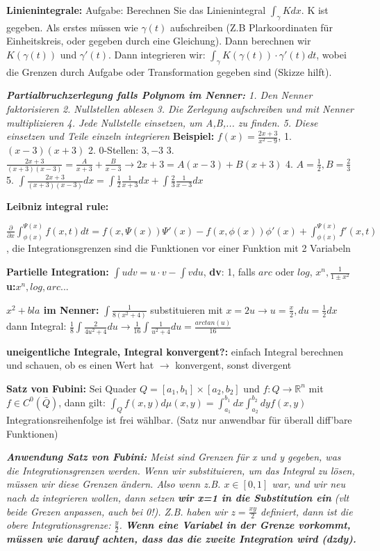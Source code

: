 \documentclass[a3paper, ngerman, 8pt]{article}
\begin{document}
\begin{multicols*}{3}
\textbf{Linienintegrale:} Aufgabe: Berechnen Sie das Linienintegral $\int_{\gamma} Kdx$. K ist gegeben. Als erstes müssen wie $\gamma (t)$ aufschreiben (Z.B Plarkoordinaten für Einheitskreis, oder gegeben durch eine Gleichung). Dann berechnen wir $K(\gamma (t))$ und $\gamma ' (t)$. Dann integrieren wir: $\int_{\gamma} K(\gamma (t))\cdot \gamma ' (t)dt$, wobei die Grenzen durch Aufgabe oder Transformation gegeben sind (Skizze hilft).

\textit{\textbf{Partialbruchzerlegung falls Polynom im Nenner:} 1. Den Nenner faktorisieren 2. Nullstellen ablesen 3. Die Zerlegung aufschreiben und mit Nenner multiplizieren 4. Jede Nullstelle einsetzen, um A,B,... zu finden. 5. Diese einsetzen und Teile einzeln integrieren}
\textbf{Beispiel: }$f(x)=\frac{2x+3}{x^2-9}$, 1. $(x-3)(x+3)$ 2. 0-Stellen: $3, -3$ 3. $\frac{2x+3}{(x+3)(x-3)}=\frac{A}{x+3}+ \frac{B}{x-3} \to 2x+3=A(x-3)+B(x+3)$ 4. $A=\frac{1}{2}, B=\frac{2}{3}$ 5. $\int\frac{2x+3}{(x+3)(x-3)}dx=\int\frac{1}{2}\frac{1}{x+3}dx+ \int\frac{2}{3}\frac{1}{x-3}dx$

\textbf{Leibniz integral rule:} 

$\frac{\partial}{\partial x}\int_{\phi (x)}^{\Psi (x)}f(x,t)dt= f(x, \Psi(x))\Psi'(x)-f(x, \phi (x))\phi'(x)+\int_{\phi (x)}^{\Psi(x)}f'(x, t)$, die Integrationsgrenzen sind die Funktionen vor einer Funktion mit 2 Variabeln

\textbf{Partielle Integration:} $\int u dv=u\cdot v -\int v du$, \textbf{dv}: 1, falls $arc$ oder $log$, $x^n, \frac{1}{1\pm x^2}$
\textbf{u:}$x^n, log, arc... $

\textbf{$x^2 + bla$ im Nenner:} $\int \frac{1}{8(x^2+4)}$ substituieren mit $x=2u \to u=\frac{x}{2}, du = \frac{1}{2}dx$ dann Integral: $\frac{1}{8}\int \frac{2}{4u^2+4}du \to \frac{1}{16} \int \frac{1}{u^2+4}du= \frac{arctan(u)}{16}$

\textbf{uneigentliche Integrale, Integral konvergent?:} einfach Integral berechnen und schauen, ob es einen Wert hat $\to$ konvergent, sonst divergent

\textbf{Satz von Fubini:} Sei Quader $Q=[a_1, b_1]\times[a_2, b_2]$ und $f: Q \to \mathbb{R}^n$ mit $f \in C^0(\bar{Q})$, dann gilt: $\int_Q f(x,y)d\mu (x, y)= \int_{a_1}^{b_1}dx\int_{a_2}^{b_2}dy f(x,y)$ Integrationsreihenfolge ist frei wählbar. (Satz nur anwendbar für überall diff'bare Funktionen)

\textit{\textbf{Anwendung Satz von Fubini:} Meist sind Grenzen für x und y gegeben, was die Integrationsgrenzen werden. Wenn wir substituieren, um das Integral zu lösen, müssen wir diese Grenzen ändern. Also wenn z.B. $x\in [0,1]$ war, und wir neu nach dz integrieren wollen, dann setzen \textbf{wir x=1 in die Substitution ein} (vlt beide Grezen anpassen, auch bei 0!). Z.B. haben wir $z=\frac{xy}{2}$ definiert, dann ist die obere Integrationsgrenze: $\frac{y}{2}$. \textbf{Wenn eine Variabel in der Grenze vorkommt, müssen wie darauf achten, dass das die zweite Integration wird (dzdy). }}


\end{multicols*}
\end{document}
